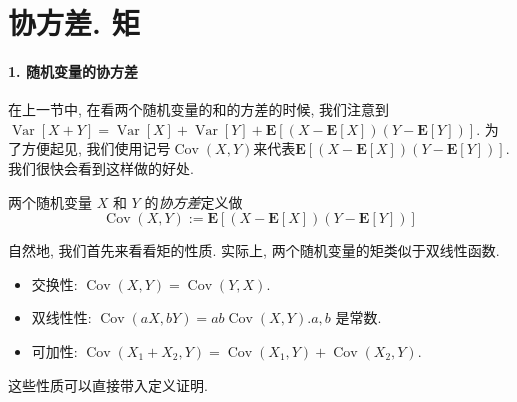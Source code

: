 \section{协方差. 矩}

\paragraph{1. 随机变量的协方差}在上一节中, 在看两个随机变量的和的方差的时候, 我们注意到$\operatorname{Var}[X+Y]=\operatorname{Var}[X]+\operatorname{Var}[Y]+\mathbf{E}[(X-\mathbf{E}[X])(Y-\mathbf{E}[Y])]$. 为了方便起见, 我们使用记号$\operatorname{Cov}(X, Y)$来代表$\mathbf{E}[(X-\mathbf{E}[X])(Y-\mathbf{E}[Y])]$. 我们很快会看到这样做的好处. 

\begin{definition}
    两个随机变量 $X$ 和 $Y$ 的\emph{协方差}定义做
$$
\operatorname{Cov}(X, Y):=\mathbf{E}[(X-\mathbf{E}[X])(Y-\mathbf{E}[Y])]
$$
\end{definition}

自然地, 我们首先来看看矩的性质. 实际上, 两个随机变量的矩类似于双线性函数. 

\begin{itemize}
    \item 交换性: $\operatorname{Cov}(X, Y)=\operatorname{Cov}(Y, X)$.
    \item 双线性性: $\operatorname{Cov}(a X, b Y)=a b \operatorname{Cov}(X, Y). a, b$ 是常数.
    \item 可加性: $\operatorname{Cov}\left(X_1+X_2, Y\right)=\operatorname{Cov}\left(X_1, Y\right)+\operatorname{Cov}\left(X_2, Y\right)$.
\end{itemize}

这些性质可以直接带入定义证明. 

